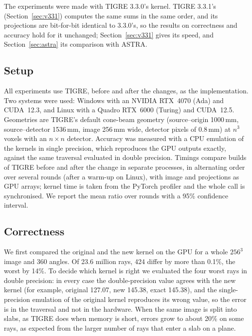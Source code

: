 \documentclass[11pt,a4paper]{article}
\theoremstyle{remark}
\begin{document}
The experiments were made with TIGRE 3.3.0's kernel. TIGRE 3.3.1's (Section~\ref{sec:v331}) computes the same sums
in the same order, and its projections are bit-for-bit identical to 3.3.0's, so the results on correctness and
accuracy hold for it unchanged; Section~\ref{sec:v331} gives its speed, and Section~\ref{sec:astra} its comparison
with ASTRA.

\subsection{Setup}

All experiments use TIGRE, before and after the changes, as the implementation. Two systems were used:
Windows with an NVIDIA RTX~4070 (Ada) and CUDA~12.3, and Linux with a Quadro RTX~6000 (Turing) and
CUDA~12.5. Geometries are TIGRE's default cone-beam geometry (source--origin 1000\,mm, source--detector
1536\,mm, image 256\,mm wide, detector pixels of 0.8\,mm) at $n^3$ voxels with an $n\times n$ detector.
Accuracy was measured with a CPU emulation of the kernels in single precision, which reproduces the GPU
outputs exactly, against the same traversal evaluated in double precision. Timings compare builds of TIGRE
before and after the change in separate processes, in alternating order over several rounds (after a
warm-up on Linux), with image and projections as GPU arrays; kernel time is taken from the PyTorch profiler
and the whole call is synchronised. We report the mean ratio over rounds with a 95\% confidence interval.

\subsection{Correctness}
\label{sec:res-correct}

We first compared the original and the new kernel on the GPU for a whole $256^3$ image and 360 angles.
Of 23.6 million rays, 424 differ by more than 0.1\%, the worst by 14\%. To decide which kernel is right we
evaluated the four worst rays in double precision: in every case the double-precision value agrees with the
new kernel (for example, original 127.07, new 145.38, exact 145.38), and the single-precision emulation of
the original kernel reproduces its wrong value, so the error is in the traversal and not in the hardware.
When the same image is split into slabs, as TIGRE does when memory is short, errors grow to about 20\% on
some rays, as expected from the larger number of rays that enter a slab on a plane.
\end{document}
